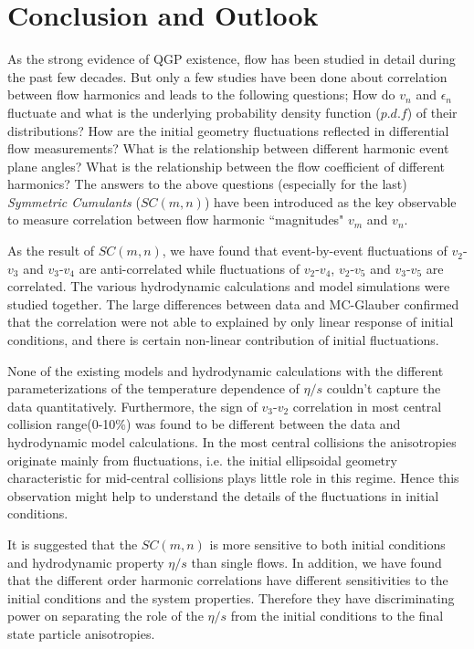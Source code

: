 

\chapter{Conclusion and Outlook}

As the strong evidence of QGP existence, flow has been studied in detail during the past few decades. But only a few studies have been done about correlation between flow harmonics and leads to the following questions; How do $v_n$ and $\epsilon_n$ fluctuate and what is the underlying probability density function ($p.d.f$) of their distributions? How are the initial geometry fluctuations reflected in differential flow measurements? What is the relationship between different harmonic event plane angles? What is the relationship between the flow coefficient of different harmonics? The answers to the above questions (especially for the last) \textit{Symmetric Cumulants} ($SC(m,n)$) have been introduced as the key observable to measure correlation between flow harmonic ``magnitudes" $v_m$ and $v_n$.



As the result of $SC(m,n)$, we have found that event-by-event fluctuations of $v_2$-$v_3$ and $v_3$-$v_4$ are anti-correlated  while fluctuations of $v_2$-$v_4$, $v_2$-$v_5$ and $v_3$-$v_5$ are correlated. The various hydrodynamic calculations and model simulations were studied together. The large differences between data and MC-Glauber confirmed that the correlation were not able to explained by only linear response of initial conditions, and there is certain non-linear contribution of initial fluctuations. 

 None of the existing models and hydrodynamic calculations with the different parameterizations of the temperature dependence of $\eta/s$ couldn't capture the data quantitatively. Furthermore, the sign of $v_3$-$v_2$ correlation in most central collision range(0-10\%) was found to be different between the data and hydrodynamic model calculations.  In the most central collisions the anisotropies originate mainly from fluctuations, i.e. the initial ellipsoidal geometry characteristic for mid-central collisions plays little role in this regime.  Hence this observation might help to understand the details of the fluctuations in initial conditions.
 
 It is suggested that the $SC(m,n)$ is more sensitive to both initial conditions and hydrodynamic property $\eta/s$ than single flows.  In addition, we have found that the different order harmonic correlations have different sensitivities to the initial conditions and the system properties. Therefore they have discriminating power on separating the role of the $\eta/s$  from the initial conditions to the final state particle anisotropies.

